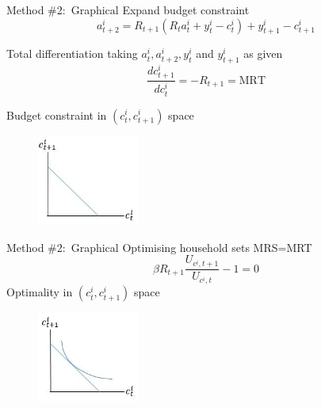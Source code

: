 
\begin{frame}{Method \#2:\ Graphical}
Expand budget constraint
\begin{equation*}
a_{t+2}^{i}=R_{t+1}\left( R_{t}a_{t}^{i}+y_{t}^{i}-c_{t}^{i}\right)+y_{t+1}^{i}-c_{t+1}^{i}
\end{equation*}

Total differentiation taking $a_{t}^{i},a_{t+2}^{i},y_{t}^{i}$ and $y_{t+1}^{i}$ as given 
\begin{equation*}
\frac{dc_{t+1}^{i}}{dc_{t}^{i}}=-R_{t+1}=\text{MRT}
\end{equation*}

Budget constraint in $(c_{t}^{i},c_{t+1}^{i})$ space
\begin{figure}
\centering
\label{fig:intertemp_c_bconstraint}
\includegraphics[width=0.3\textwidth]{Figures/intertemp_c_bconstraint.JPG}
\end{figure}
\end{frame}


\begin{frame}{Method \#2:\ Graphical}
Optimising household sets MRS=MRT 
\begin{equation*}
\beta R_{t+1}\frac{U_{c^{i},t+1}}{U_{c^{i},t}}-1=0
\end{equation*}
Optimality in $(c_{t}^{i},c_{t+1}^{i})$ space
\begin{figure}
\centering
\label{fig:intertemp_c_tangency}
\includegraphics[width=0.3\textwidth]{Figures/intertemp_c_tangency.JPG}
\end{figure}
\end{frame}

